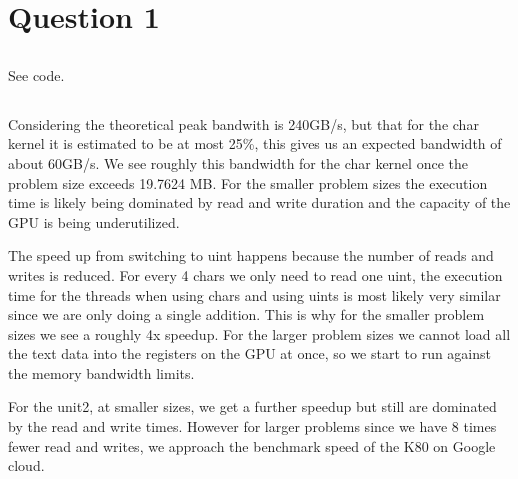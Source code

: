 \section{Question 1}

\subsection{}
See code.


\subsection{}


\subsection{}
Considering the theoretical peak bandwith is 240GB/s, but that for the char kernel it is estimated to be at most 25\%, this gives us an expected bandwidth of about 60GB/s. We see roughly this bandwidth for the char kernel once the problem size exceeds 19.7624 MB. For the smaller problem sizes the execution time is likely being dominated by read and write duration and the capacity of the GPU is being underutilized.

The speed up from switching to uint happens because the number of reads and writes is reduced. For every 4 chars we only need to read one uint, the execution time for the threads when using chars and using uints is most likely very similar since we are only doing a single addition. This is why for the smaller problem sizes we see a roughly 4x speedup. For the larger problem sizes we cannot load all the text data into the registers on the GPU at once, so we start to run against the memory bandwidth limits.

For the unit2, at smaller sizes, we get a further speedup but still are dominated by the read and write times. However for larger problems since we have 8 times fewer read and writes, we approach the benchmark speed of the K80 on Google cloud.